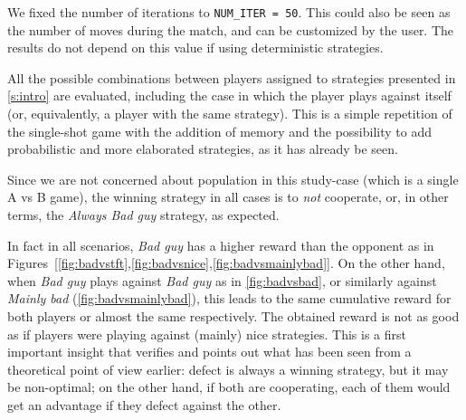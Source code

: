 \documentclass[journal,a4paper,10pt,twoside]{IEEEtran} %
\begin{document}
We fixed the number of iterations to \texttt{NUM\_ITER = 50}. This could also be seen as the number of moves during the match, and can be customized by the user. The results do not depend on this value if using deterministic strategies.

All the possible combinations between players assigned to strategies presented in \ref{s:intro} are evaluated, including the case in which the player plays against itself (or, equivalently, a player with the same strategy).
This is a simple repetition of the single-shot game with the addition of memory and the possibility to add probabilistic and more elaborated strategies, as it has already be seen.

Since we are not concerned about population in this study-case (which is a single A vs B game), the winning strategy in all cases is to \textit{not} cooperate, or, in other terms, the \textit{Always Bad guy} strategy, as expected.

In fact in all scenarios, \textit{Bad guy} has a higher reward than the opponent as in Figures~[\ref{fig:badvstft},\ref{fig:badvsnice},\ref{fig:badvsmainlybad}]. 
On the other hand, when \textit{Bad guy} plays against \textit{Bad guy} as in \autoref{fig:badvsbad}, or similarly against \textit{Mainly bad} (\autoref{fig:badvsmainlybad}), this leads to the same cumulative reward for both players or almost the same respectively. The obtained reward is not as good as if players were playing against (mainly) nice strategies. This is a first important insight that verifies and points out what has been seen from a theoretical point of view earlier: defect is always a winning strategy, but it may be non-optimal; on the other hand, if both are cooperating, each of them would get an advantage if they defect against the other.
\end{document}
